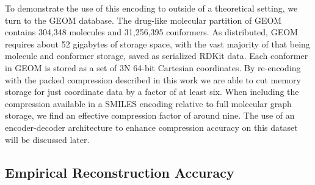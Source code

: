 \documentclass[%
 preprint,
superscriptaddress,
 amsmath,amssymb,
 aip,
 jcp,
]{revtex4-2}
\begin{document}
To demonstrate the use of this encoding to outside of a theoretical setting, we turn to the GEOM database.\cite{GEOM}
The drug-like molecular partition of GEOM contains 304,348 molecules and 31,256,395 conformers.
As distributed, GEOM requires about 52 gigabytes of storage space, with the vast majority of that being molecule and conformer storage, saved as serialized RDKit data.
Each conformer in GEOM is stored as a set of 3N 64-bit Cartesian coordinates.
By re-encoding with the packed compression described in this work we are able to cut memory storage for just coordinate data by a factor of at least six.
When including the compression available in a SMILES encoding relative to full molecular graph storage, we find an effective compression factor of around nine.
The use of an encoder-decoder architecture to enhance compression accuracy on this dataset will be discussed later.




\subsection{Empirical Reconstruction Accuracy}
\end{document}
